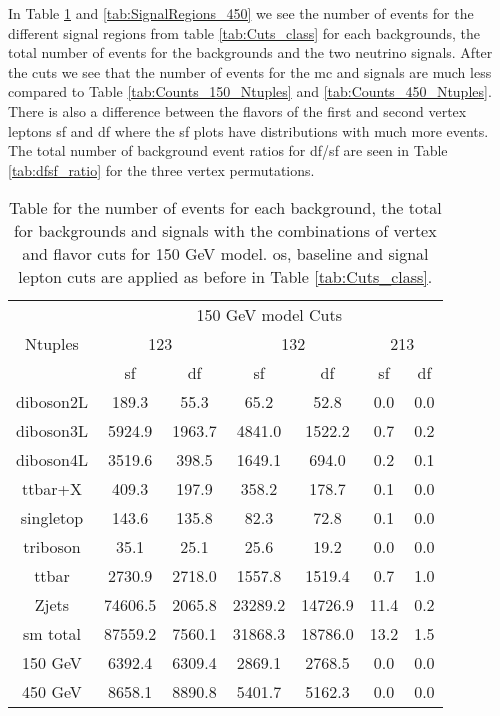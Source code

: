 \documentclass[a4paper, american, 12pt]{report}
\begin{document}
	In Table \ref{tab:SignalRegions_150} and \ref{tab:SignalRegions_450} we see the number of events for the different signal regions from table \ref{tab:Cuts_class} for each backgrounds, the total number of events for the backgrounds and the two neutrino signals. After the cuts we see that the number of events for the \acrshort{mc} and signals are much less compared to Table \ref{tab:Counts_150_Ntuples} and \ref{tab:Counts_450_Ntuples}. There is also a difference between the flavors of the first and second vertex leptons \acrshort{sf} and \acrshort{df} where the \acrshort{sf} plots have distributions with much more events. The total number of background event ratios for \acrshort{df}/\acrshort{sf} are seen in Table \ref{tab:dfsf_ratio} for the three vertex permutations.
	\begin{table}[htb!]
		\centering
		\begin{tabular}{ |c|c|c|c|c|c|c| }
			\hline
			\multirow{3}{*}{Ntuples} & \multicolumn{6}{c|}{150 GeV model Cuts} \\
			\cline{2-7} \rule{0pt}{13pt}
			& \multicolumn{2}{c}{123} & \multicolumn{2}{|c}{132} & \multicolumn{2}{|c|}{213} \\
			\cline{2-7} \rule{0pt}{13pt}
			& \acrshort{sf} & \acrshort{df} & \acrshort{sf} & \acrshort{df} & \acrshort{sf} & \acrshort{df} \\
			\hline \rule{0pt}{13pt}
			diboson2L & 189.3 & 55.3 & 65.2 & 52.8 & 0.0 & 0.0 \\
			\hline \rule{0pt}{13pt}
			diboson3L & 5924.9 & 1963.7 & 4841.0 & 1522.2 & 0.7 & 0.2 \\
			\hline \rule{0pt}{13pt}
			diboson4L & 3519.6 & 398.5 & 1649.1 & 694.0 & 0.2 & 0.1 \\
			\hline \rule{0pt}{13pt}
			ttbar+X & 409.3 & 197.9 & 358.2 & 178.7 & 0.1 & 0.0 \\
			\hline \rule{0pt}{13pt}
			singletop & 143.6 & 135.8 & 82.3 & 72.8 & 0.1 & 0.0 \\
			\hline \rule{0pt}{13pt}
			triboson & 35.1 & 25.1 & 25.6 & 19.2 & 0.0 & 0.0 \\
			\hline \rule{0pt}{13pt}
			ttbar & 2730.9 & 2718.0 & 1557.8 & 1519.4 & 0.7 & 1.0 \\
			\hline \rule{0pt}{13pt}
			Zjets & 74606.5 & 2065.8 & 23289.2 & 14726.9 & 11.4 & 0.2 \\
			\hline \rule{0pt}{13pt}
			\acrshort{sm} total & 87559.2 & 7560.1 & 31868.3 & 18786.0 & 13.2 & 1.5 \\
			\hline \rule{0pt}{13pt}
			150 GeV & 6392.4 & 6309.4 & 2869.1 & 2768.5 & 0.0 & 0.0 \\
			\hline \rule{0pt}{13pt}
			450 GeV & 8658.1 & 8890.8 & 5401.7 & 5162.3 & 0.0 & 0.0 \\
			\hline
		\end{tabular}	
		\caption[Number of events for signal regions for 150 GeV.]{Table for the number of events for each background, the total for backgrounds and signals with the combinations of vertex and flavor cuts for 150 GeV model. \acrshort{os}, baseline and signal lepton cuts are applied as before in Table \ref{tab:Cuts_class}.}
		\label{tab:SignalRegions_150}
	\end{table}
\end{document}
